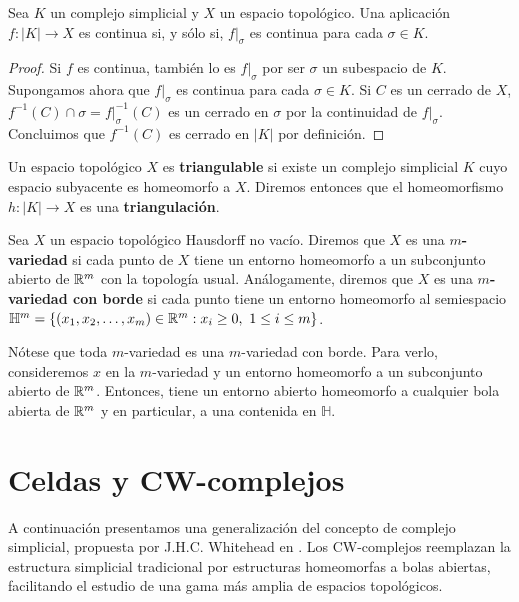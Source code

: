 \begin{lema}
	\label{lem:cont_poly} Sea $K$ un complejo simplicial y $X$ un espacio topológico.
	Una aplicación $f: |K| \rightarrow X$ es continua si, y sólo si, $f|_{\sigma}$
	es continua para cada $\sigma \in K$.
\end{lema}
\begin{proof}
	Si $f$ es continua, también lo es $f|_{\sigma}$ por ser $\sigma$ un subespacio
	de $K$. Supongamos ahora que $f|_{\sigma}$ es continua para cada $\sigma \in K$.
	Si $C$ es un cerrado de $X$, $f^{-1}(C) \cap \sigma = f|_{\sigma}^{-1}(C)$ es un
	cerrado en $\sigma$ por la continuidad de $f|_{\sigma}$. Concluimos que
	$f^{-1}(C)$ es cerrado en $|K|$ por definición.
\end{proof}
\begin{definicion}
	Un espacio topológico $X$ es \textbf{triangulable} si existe un complejo
	simplicial $K$ cuyo espacio subyacente es homeomorfo a $X$. Diremos entonces que
	el homeomorfismo $h: |K| \rightarrow X$ es una \textbf{triangulación}.
\end{definicion}

\begin{definicion}
	Sea \(X\) un espacio topológico Hausdorff no vacío. Diremos que \(X\) es una \textbf{\(m\)-variedad} 
	si cada punto de \(X\) tiene un entorno homeomorfo a un subconjunto abierto de \(\mathbb{R}^m\) con la 
	topología usual. Análogamente, diremos que \(X\) es una \textbf{\(m\)-variedad con borde} si 
	cada punto tiene un entorno homeomorfo al semiespacio 
	\(\mathbb{H}^m = \{ (x_1, x_2, \ldots,x_m) \in \mathbb{R}^m : x_i \geq 0,\ 1 \leq i \leq m \}\).
\end{definicion}
\begin{observacion}
	Nótese que toda \(m\)-variedad es una \(m\)-variedad con borde. Para verlo, consideremos \(x\) 
	en la \(m\)-variedad y un entorno homeomorfo a un subconjunto abierto de \(\mathbb{R}^m\). Entonces, 
	tiene un entorno abierto homeomorfo a cualquier bola abierta de \(\mathbb{R}^m\) y en particular, 
	a una contenida en \(\mathbb{H}\).
\end{observacion}

\section{Celdas y CW-complejos}

A continuación presentamos una generalización del concepto de complejo
simplicial, propuesta por J.H.C. Whitehead en \cite{MR0030759}. Los CW-complejos
reemplazan la estructura simplicial tradicional por estructuras homeomorfas a bolas
abiertas, facilitando el estudio de una gama más amplia de espacios topológicos.

